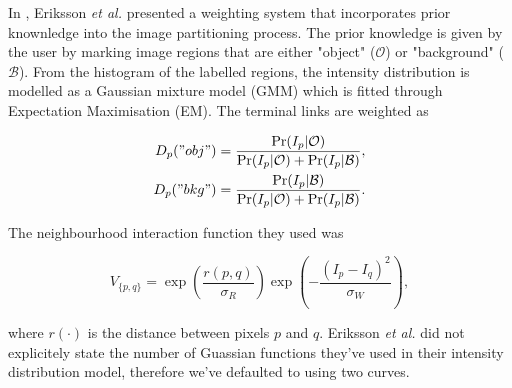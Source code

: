 \begin{definition} In \citep{Eriksson2006}, Eriksson \textit{et al.} presented a weighting system that incorporates prior knownledge into the image partitioning process. The prior knowledge is given by the user by marking image regions that are either "object" ($\mathcal{O}$) or "background" ($\mathcal{B}$). From the histogram of the labelled regions, the intensity distribution is modelled as a Gaussian mixture model (GMM) which is fitted through Expectation Maximisation (EM). The terminal links are weighted as
	
\begin{align}
	D_p("obj") &= \frac{\Pr(I_p|\mathcal{O})}{\Pr(I_p|\mathcal{O})+\Pr(I_p|\mathcal{B})}, \\
	D_p("bkg") &= \frac{\Pr(I_p|\mathcal{B})}{\Pr(I_p|\mathcal{O})+\Pr(I_p|\mathcal{B})}.
\end{align}

The neighbourhood interaction function they used was
	
\begin{equation}
	V_{\{p,q\}} = \exp\left( \frac{r(p,q)}{\sigma_R} \right)\exp\left( -\frac{(I_p-I_q)^2}{\sigma_W} \right),
\end{equation}
	
where $r(\cdot)$ is the distance between pixels $p$ and $q$. Eriksson \textit{et al.} did not explicitely state the number of Guassian functions they've used in their intensity distribution model, therefore we've defaulted to using two curves.
	
\end{definition}

